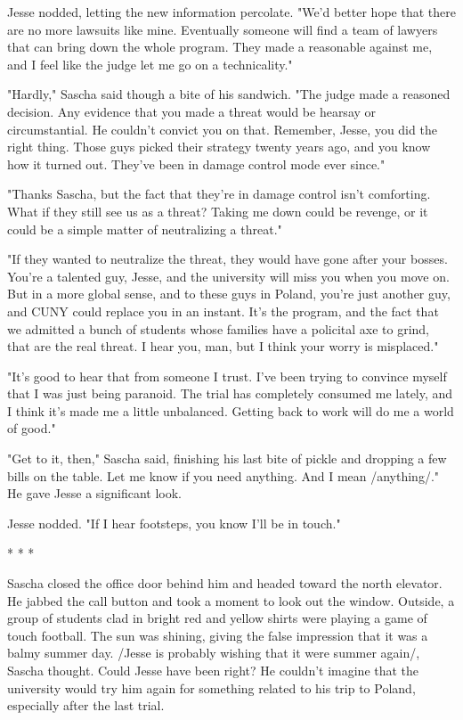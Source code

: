 Jesse nodded, letting the new information percolate.  "We'd better hope that there are no more lawsuits like mine.  Eventually someone will find a team of lawyers that can bring down the whole program.  They made a reasonable against me, and I feel like the judge let me go on a technicality."

"Hardly," Sascha said though a bite of his sandwich.  "The judge made a reasoned decision.  Any evidence that you made a threat would be hearsay or circumstantial.  He couldn't convict you on that.  Remember, Jesse, you did the right thing.  Those guys picked their strategy twenty years ago, and you know how it turned out.  They've been in damage control mode ever since."

"Thanks Sascha, but the fact that they're in damage control isn't comforting.  What if they still see us as a threat?  Taking me down could be revenge, or it could be a simple matter of neutralizing a threat."

"If they wanted to neutralize the threat, they would have gone after your bosses.  You're a talented guy, Jesse, and the university will miss you when you move on.  But in a more global sense, and to these guys in Poland, you're just another guy, and CUNY could replace you in an instant.  It's the program, and the fact that we admitted a bunch of students whose families have a policital axe to grind, that are the real threat.  I hear you, man, but I think your worry is misplaced."

"It's good to hear that from someone I trust.  I've been trying to convince myself that I was just being paranoid.  The trial has completely consumed me lately, and I think it's made me a little unbalanced.  Getting back to work will do me a world of good."

"Get to it, then," Sascha said, finishing his last bite of pickle and dropping a few bills on the table.  Let me know if you need anything.  And I mean /anything/."  He gave Jesse a significant look.

Jesse nodded.  "If I hear footsteps, you know I'll be in touch."

										* * *
										
Sascha closed the office door behind him and headed toward the north elevator.  He jabbed the call button and took a moment to look out the window.  Outside, a group of students clad in bright red and yellow shirts were playing a game of touch football.  The sun was shining, giving the false impression that it was a balmy summer day.  /Jesse is probably wishing that it were summer again/, Sascha thought.  Could Jesse have been right?  He couldn't imagine that the university would try him again for something related to his trip to Poland, especially after the last trial.

